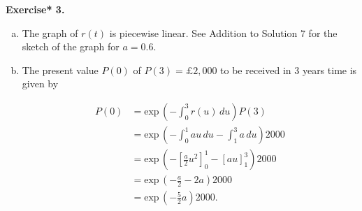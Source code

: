 \documentclass[11pt,a4paper]{article}
\begin{document}
    \textbf{Exercise* 3.}
    \begin{enumerate}[(a)]
        \item The graph of $r(t)$ is piecewise linear. See Addition to Solution $7$ for the sketch of the graph for $a = 0.6$.
        \item The present value $P(0)$ of $P(3) = \pounds 2, 000$ to be received in $3$ years time is given by
        
        \begin{align*}
            P(0) 
            &= \text{exp}\, \left(-\int_0^3 r(u)\, du \right)P(3)\\
            &= \text{exp}\, \left(-\int_0^1 au\, du - \int_1^3 a\, du\right)2000\\
            &= \text{exp}\, \left(-\left[\frac{a}{2}u^2\right]_0^1-\left[au\right]_1^3\right)2000\\
            &= \text{exp}\, \left(-\frac{a}{2}-2a\right)2000\\
            &= \text{exp}\, \left(-\frac{5}{2}a\right)2000.
        \end{align*}

    \end{enumerate}
\end{document}
